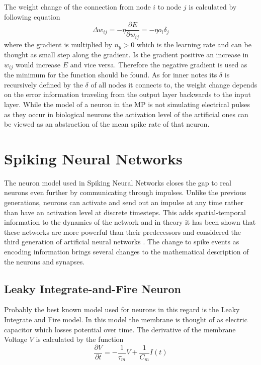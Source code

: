 The weight change of the connection from node $i$ to node $j$ is calculated by following equation
\begin{equation}
  \Delta w_{ij} = -\eta \frac{\partial E}{\partial w_{ij}} = - \eta o_i \delta_j
\end{equation}
where the gradient is multiplied by $n_y > 0$ which is the learning rate and can be thought as small step along the gradient. Is the gradient positive an increase in $w_{ij}$ would increase $E$ and vice versa. Therefore the negative gradient is used as the minimum for the function should be found. As for inner notes its $\delta$ is recursively defined by the $\delta$ of all nodes it connects to, the weight change depends on the error information traveling from the output layer backwards to the input layer\cite{sporea2013supervised}.
\newline
While the model of a neuron in the MP is not simulating electrical pulses as they occur in biological neurons the activation level of the artificial ones can be viewed as an abstraction of the mean spike rate of that neuron.



\section{Spiking Neural Networks}

The neuron model used in Spiking Neural Networks closes the gap to real neurons even further by communicating through impulses. Unlike the previous generations, neurons can activate and send out an impulse at any time rather than have an activation level at discrete timesteps. This adds spatial-temporal information to the dynamics of the network and in theory it has been shown that these networks are more powerful than their predecessors and considered the third generation of artificial neural networks \cite{maass1997networks}.
\newline
The change to spike events as encoding information brings several changes to the mathematical description of the neurons and synapses.

\subsection{Leaky Integrate-and-Fire Neuron}
Probably the best known model used for neurons in this regard is the Leaky Integrate and Fire model. In this model the membrane is thought of as electric capacitor which losses potential over time. The derivative of the membrane Voltage $V$ is calculated by the function
\begin{equation}
  \frac{\partial V}{\partial t} = - \frac{1}{\tau_m}V + \frac{1}{C_m}I(t)
\end{equation}

